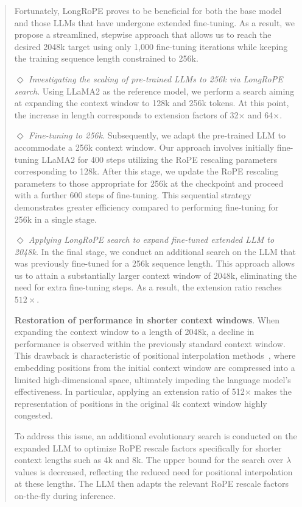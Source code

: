 \begin{abstract}
Fortunately, LongRoPE proves to be beneficial for both the base model and those LLMs that have undergone extended fine-tuning. As a result, we propose a streamlined, stepwise approach that allows us to reach the desired 2048k target using only 1,000 fine-tuning iterations while keeping the training sequence length constrained to 256k.

$\Diamond$ \textit{Investigating the scaling of pre-trained LLMs to 256k via LongRoPE search}. Using LLaMA2 as the reference model, we perform a search aiming at expanding the context window to 128k and 256k tokens. At this point, the increase in length corresponds to extension factors of 32$\times$ and 64$\times$.

$\Diamond$ \textit{Fine-tuning to 256k}. Subsequently, we adapt the pre-trained LLM to accommodate a 256k context window. Our approach involves initially fine-tuning LLaMA2 for 400 steps utilizing the RoPE rescaling parameters corresponding to 128k. After this stage, we update the RoPE rescaling parameters to those appropriate for 256k at the checkpoint and proceed with a further 600 steps of fine-tuning. This sequential strategy demonstrates greater efficiency compared to performing fine-tuning for 256k in a single stage.

$\Diamond$ \textit{Applying LongRoPE search to expand fine-tuned extended LLM to 2048k.} In the final stage, we conduct an additional search on the LLM that was previously fine-tuned for a 256k sequence length. This approach allows us to attain a substantially larger context window of 2048k, eliminating the need for extra fine-tuning steps. As a result, the extension ratio reaches $512\times$.

\textbf{Restoration of performance in shorter context windows}.  When expanding the context window to a length of 2048k, a decline in performance is observed within the previously standard context window. This drawback is characteristic of positional interpolation methods~\cite{pi}, where embedding positions from the initial context window are compressed into a limited high-dimensional space, ultimately impeding the language model’s effectiveness. In particular, applying an extension ratio of 512$\times$ makes the representation of positions in the original 4k context window highly congested.

To address this issue, an additional evolutionary search is conducted on the expanded LLM to optimize RoPE rescale factors specifically for shorter context lengths such as 4k and 8k. The upper bound for the search over $\lambda$ values is decreased, reflecting the reduced need for positional interpolation at these lengths. The LLM then adapts the relevant RoPE rescale factors on-the-fly during inference.


\end{abstract}
